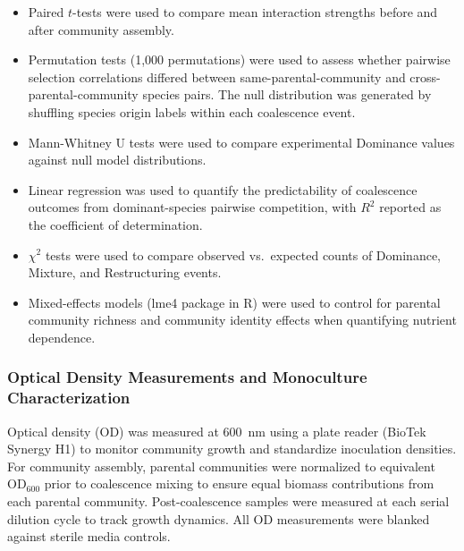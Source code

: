 \begin{itemize}
    \item Paired $t$-tests were used to compare mean interaction strengths before and after community assembly.
    \item Permutation tests (1,000 permutations) were used to assess whether pairwise selection correlations differed between same-parental-community and cross-parental-community species pairs. The null distribution was generated by shuffling species origin labels within each coalescence event.
    \item Mann-Whitney U tests were used to compare experimental Dominance values against null model distributions.
    \item Linear regression was used to quantify the predictability of coalescence outcomes from dominant-species pairwise competition, with $R^2$ reported as the coefficient of determination.
    \item $\chi^2$ tests were used to compare observed vs.\ expected counts of Dominance, Mixture, and Restructuring events.
    \item Mixed-effects models (lme4 package in R) were used to control for parental community richness and community identity effects when quantifying nutrient dependence.
\end{itemize}


\subsubsection*{Optical Density Measurements and Monoculture Characterization}
\label{sec:suppl:od}

Optical density (OD) was measured at 600~nm using a plate reader (BioTek Synergy H1) to monitor community growth and standardize inoculation densities. For community assembly, parental communities were normalized to equivalent OD$_{600}$ prior to coalescence mixing to ensure equal biomass contributions from each parental community. Post-coalescence samples were measured at each serial dilution cycle to track growth dynamics. All OD measurements were blanked against sterile media controls.

